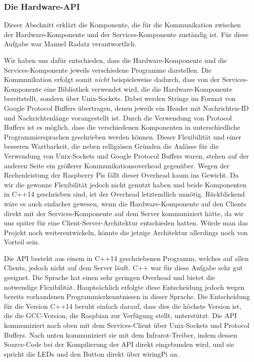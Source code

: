 \subsubsection{Die Hardware-API}

Dieser Abschnitt erklärt die Komponente, die für die Kommunikation zwischen der Hardware-Komponente
und der Services-Komponente zuständig ist.
Für diese Aufgabe war Manuel Radatz verantwortlich.

Wir haben uns dafür entschieden, dass die Hardware-Komponente und die Services-Komponente jeweils
verschiedene Programme darstellen.
Die Kommunikation erfolgt somit \textit{nicht} beispielsweise dadurch, dass von der
Services-Komponente eine Bibliothek verwendet wird, die die Hardware-Komponente bereitstellt,
sondern über Unix-Sockets.
Dabei werden Strings im Format von Google Protocol Buffers übertragen, denen jeweils ein Header mit
Nachrichten-ID und Nachrichtenlänge vorangestellt ist.
Durch die Verwendung von Protocol Buffers ist es möglich, dass die verschiedenen Komponenten in
unterschiedliche Programmiersprachen geschrieben werden können.
Dieser Flexibilität und einer besseren Wartbarkeit, die neben relligiösen Gründen die Anlässe für
die Verwendung von Unix-Sockets und Google Protocol Buffers waren, stehen auf der anderen Seite ein
größerer Kommunikationsoverhead gegenüber.
Wegen der Rechenleistung der Raspberry Pis fällt dieser Overhead kaum ins Gewicht.
Da wir die gewonne Flexibilität jedoch nicht genutzt haben und beide Komponenten in C++14
geschrieben sind, ist der Overhead letztendlich unnötig.
Rückblickend wäre es auch einfacher gewesen, wenn die Hardware-Komponente auf den Clients direkt
mit der Services-Komponente auf dem Server kommuniziert hätte, da wir uns später für eine
Client-Server-Architektur entschieden hatten.
Würde man das Projekt noch weiterentwickeln, könnte die jetzige Architektur allerdings noch von
Vorteil sein.

Die API besteht aus einem in C++14 geschriebenen Programm, welches auf allen Clients, jedoch nicht
auf dem Server läuft.
C++ war für diese Aufgabe sehr gut geeignet.
Die Sprache hat einen sehr geringen Overhead und bietet die notwendige Flexibilität.
Hauptsächlich erfolgte diese Entscheidung jedoch wegen bereits vorhandenen Programmierkenntnissen
in dieser Sprache.
Die Entscheidung für die Version C++14 beruht einfach darauf, dass dies die höchste Version ist, die
die GCC-Version, die Raspbian zur Verfügung stellt, unterstützt.
Die API kommuniziert nach oben mit dem Services-Client über Unix-Sockets und Protocol Buffers.
Nach unten kommuniziert sie mit dem Infrarot-Treiber, indem dessen Source-Code bei der Kompilierung
der API direkt eingebunden wird, und sie spricht die LEDs und den Button direkt über wiringPi an.

